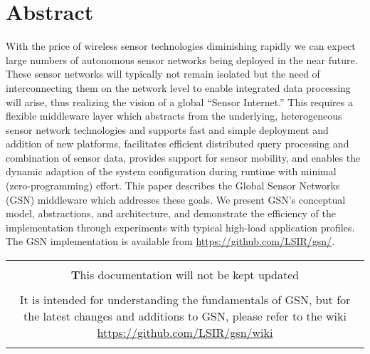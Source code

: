 \chapter{Abstract}
  With the price of wireless sensor technologies diminishing rapidly we can
  expect large numbers of autonomous sensor networks being deployed in the near
  future. These sensor networks will typically not remain isolated but the need
  of interconnecting them on the network level to enable integrated data
  processing will arise, thus realizing the vision of a global ``Sensor
  Internet.'' This requires a flexible middleware layer which abstracts from
  the underlying, heterogeneous sensor network technologies and supports fast
  and simple deployment and addition of new platforms, facilitates efficient
  distributed query processing and combination of sensor data, provides support
  for sensor mobility, and enables the dynamic adaption of the system
  configuration during runtime with minimal (zero-programming) effort. This
  paper describes the Global Sensor Networks (GSN) middleware which addresses
  these goals. We present GSN's conceptual model, abstractions, and
  architecture, and demonstrate the efficiency of the implementation through
  experiments with typical high-load application profiles. The GSN
  implementation is available from \url{https://github.com/LSIR/gsn/}.	
  
  
  
\begin{table*}[!htp]
	\centering
	{\normalfont\footnotesize
	\begin{tabulary}{\textwidth}{|C|}%
	\hline
	\\
		\textbf This documentation will not be kept updated \\
		\\
		It is intended for understanding the fundamentals of GSN, but for the latest changes and additions to GSN, please refer to the wiki \url{https://github.com/LSIR/gsn/wiki}
		 \\
		\\
	\hline

	\end{tabulary}
	}
\end{table*}



 
 \newpage